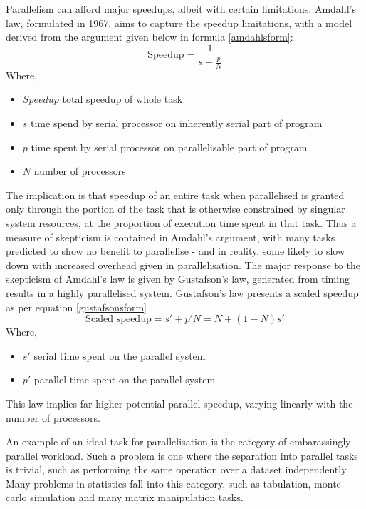\documentclass[a4paper,10pt]{article}
\begin{document}
Parallelism can afford major speedups, albeit with certain limitations.
Amdahl's law, formulated in 1967, aims to capture the speedup limitations, with a model derived from the argument given below in formula \ref{amdahlsform}\cite{amdahl1967law}\cite{gustafson1988law}:
\begin{equation}
	\label{amdahlsform}
	\textrm{Speedup} = \frac{1}{s+\frac{p}{N}}
\end{equation}
Where,
\begin{itemize}
	\item \(Speedup\) total speedup of whole task
	\item \(s\) time spend by serial processor on inherently serial part of program
	\item \(p\) time spent by serial processor on parallelisable part of program
	\item \(N\) number of processors
\end{itemize}
The implication is that speedup of an entire task when parallelised is granted only through the portion of the task that is otherwise constrained by singular system resources, at the proportion of execution time spent in that task.
Thus a measure of skepticism is contained in Amdahl's argument, with many tasks predicted to show no benefit to parallelise - and in reality, some likely to slow down with increased overhead given in parallelisation. 
The major response to the skepticism of Amdahl's law is given by Gustafson's law, generated from timing results in a highly parallelised system.
Gustafson's law presents a scaled speedup as per equation \ref{gustafsonsform}
\begin{equation}
	\label{gustafsonsform}
	\textrm{Scaled speedup} = s' + p'N = N + (1-N)s'
\end{equation}
Where,
\begin{itemize}
	\item \(s'\) serial time spent on the parallel system
	\item \(p'\) parallel time spent on the parallel system
\end{itemize}
This law implies far higher potential parallel speedup, varying linearly with the number of processors.

An example of an ideal task for parallelisation is the category of embarassingly parallel workload.
Such a problem is one where the separation into parallel tasks is trivial, such as performing the same operation over a dataset independently\cite{foster1995parallel}.
Many problems in statistics fall into this category, such as tabulation, monte-carlo simulation and many matrix manipulation tasks.
\end{document}
